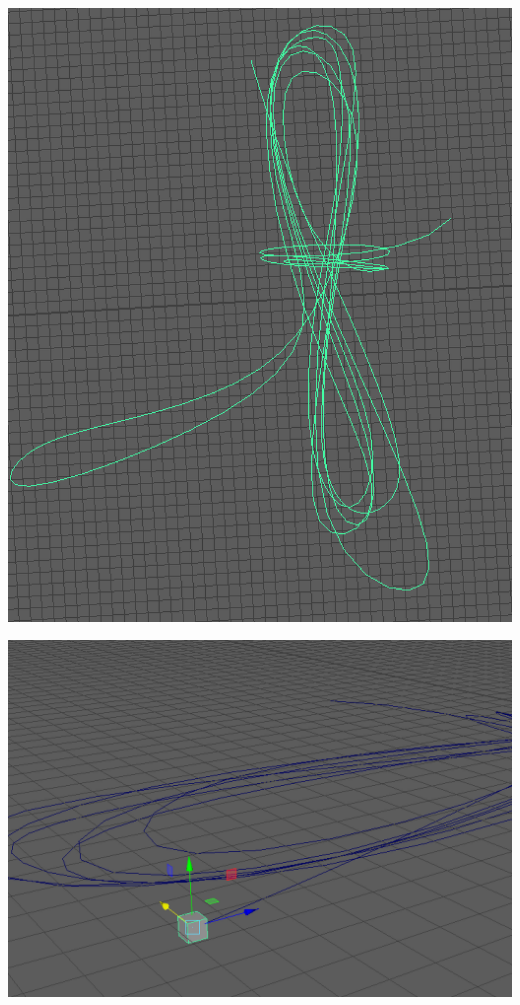 \documentclass[a4paper, openright, twoside]{book}
\begin{document}
\begin{minipage}{\textwidth}\label{tow}
\centering
\begin{center}
    \centering
    \begin{minipage}{0.18\textwidth}
        \centering
        \includegraphics[width=1\textwidth]{images/towcurve.png}
    \end{minipage}\hfill
    \begin{minipage}{0.18\textwidth}
        \centering
        \includegraphics[width=1\textwidth]{images/towpoly.png}

\end{minipage}
\end{center}
\end{minipage}
\end{document}
